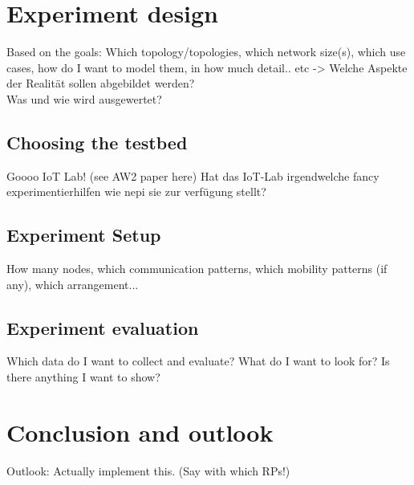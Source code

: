\documentclass{acm_proc_article-sp}
\begin{document}
\section{Experiment design}
\label{sec:Design}
Based on the goals: Which topology/topologies, which network size(s), which use cases, how do I want to model them, in how much detail.. etc -> Welche Aspekte der Realität sollen abgebildet werden?\\
Was und wie wird ausgewertet?

\subsection{Choosing the testbed}
\label{subsec:testbed_choice}
Goooo IoT Lab! (see AW2 paper here)
Hat das IoT-Lab irgendwelche fancy experimentierhilfen wie nepi sie zur verfügung stellt?

\subsection{Experiment Setup}
\label{subsec:setup}
How many nodes, which communication patterns, which mobility patterns (if any), which arrangement...

\subsection{Experiment evaluation}
\label{subsec:evaluation}
Which data do I want to collect and evaluate? What do I want to look for? Is there anything I want to show?


\section{Conclusion and outlook}
\label{sec:Conclusion}

Outlook: Actually implement this. (Say with which RPs!)



\end{document}
